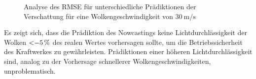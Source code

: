 \begin{figure}[t]
    \centering
    \setlength{\fboxsep}{1pt}
    \setlength{\fboxrule}{1pt}
    \caption[Analyse des RMSE für unterschiedliche Prädiktionen der Verschattung für eine Wolkengeschwindigkeit von $\SI{30}{\metre\per\second}$]{Analyse des RMSE für unterschiedliche Prädiktionen der Verschattung für eine Wolkengeschwindigkeit von $\SI{30}{\metre\per\second}$}
    \label{fig_shadingrmse}
\end{figure}

Es zeigt sich, dass die Prädiktion des Nowcastings keine Lichtdurchlässigkeit der Wolken $\SI{<-5}{\percent}$ des realen Wertes vorhersagen sollte, um die Betriebssicherheit des Kraftwerkes zu gewährleisten.
Prädiktionen einer höheren Lichtdurchlässigkeit sind, analog zu der Vorhersage schnellerer Wolkengeschwindigkeiten, unproblematisch.
